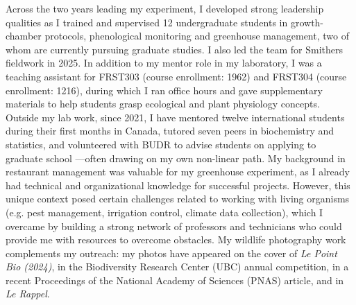 \documentclass[12pt]{article}
\begin{document}
Across the two years leading my experiment, I developed strong leadership qualities as I trained and supervised 12 undergraduate students in growth-chamber protocols, phenological monitoring and greenhouse management, two of whom are currently pursuing graduate studies. I also led the team for Smithers fieldwork in 2025. In addition to my mentor role in my laboratory, I was a teaching assistant for FRST303 (course enrollment: 1962) and FRST304 (course enrollment: 1216), during which I ran office hours and gave supplementary materials to help students grasp ecological and plant physiology concepts. Outside my lab work, since 2021, I have mentored twelve international students during their first months in Canada, tutored seven peers in biochemistry and statistics, and volunteered with BUDR to advise students on applying to graduate school ---often drawing on my own non-linear path. 
My background in restaurant management was valuable for my greenhouse experiment, as I already had technical and organizational knowledge for successful projects. However, this unique context posed certain challenges related to working with living organisms (e.g. pest management, irrigation control, climate data collection), which I overcame by building a strong network of professors and technicians who could provide me with resources to overcome obstacles.
My wildlife photography work complements my outreach: my photos have appeared on the cover of \textit{Le Point Bio (2024)}, in the Biodiversity Research Center (UBC) annual competition, in a recent 
Proceedings of the National Academy of Sciences (PNAS) article, and in \textit{Le Rappel}.
\end{document}
